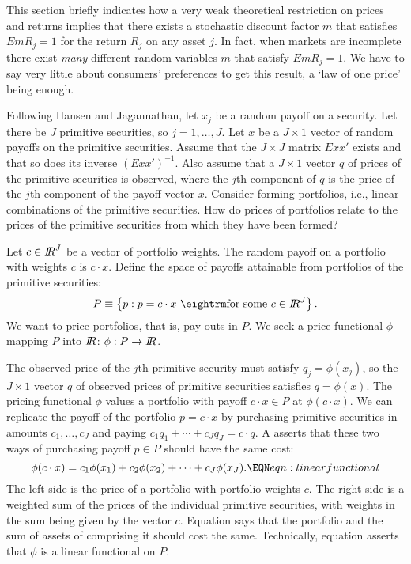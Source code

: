 This section briefly indicates how a very weak theoretical restriction on  prices and returns
implies that there exists a stochastic discount factor $m$ that satisfies
$E m R_j =1$ for the return $R_j$ on any asset $j$. In fact, when markets are incomplete there exist {\it many\/} different random variables
$m$ that satisfy $E m R_j =1$.  We have to say very little about consumers' preferences to get this result, a `law of one price' being
 enough.

Following Hansen and Jagannathan, let $x_j$ be a random payoff on a security.
Let there be $J$ primitive securities, so $j = 1, \ldots, J$.  Let
$x$ be a $J \times 1$  vector of random payoffs on the primitive securities.
Assume that the $J \times J$ matrix $E x x'$ exists and that so does its inverse
$(E x x')^{-1}$.  Also assume that
a $J \times 1$ vector $q$ of prices  of the primitive securities is observed,
where the $j$th component of $q$ is the price of the $j$th component of
the payoff vector $x$.  Consider forming portfolios, i.e., linear combinations of the primitive securities.
 How do  prices of portfolios
relate to the prices of the primitive securities from which they have been formed?

Let $c\in {I\kern-0.3em R}^J$ be a vector of portfolio weights.  The random payoff
on a portfolio with weights $c$ is $c \cdot x$.
Define the space of payoffs attainable from
portfolios of the primitive securities:
$$ P \equiv \left\{ p: p = c\cdot x \ {\rm for \ some} \ c \in \bbR^J\right\}.$$
We want to price  portfolios, that is, pay outs in $P$.
We seek a price functional $\phi$ mapping $P$ into ${I\kern-0.3em R}$:
$\phi: P \rightarrow {I\kern-0.3em R}$.


The observed price of the $j$th primitive security must satisfy  $q_j = \phi(x_j)$, so
the  $J \times 1$ vector $q$ of observed prices of primitive securities satisfies
 $q  = \phi(x)$.
The pricing functional $\phi$ values a portfolio with payoff $c \cdot x \in P$ at   $\phi(c\cdot x)$.  We can replicate the payoff of the portfolio $p = c \cdot x$ by purchasing primitive securities in amounts
$c_1, \ldots, c_J$ and paying
  $c_1 q_1 + \cdots + c_J q_J = c \cdot q$.  A  {\it {}\/} asserts that these two ways of purchasing payoff $p \in P$ should have the same cost:
$$  \phi(c \cdot x) = c_1 \phi(x_1) + c_2 \phi(x_2) + \cdots + c_J \phi(x_J) .\EQN eqn:linearfunctional $$
The left side is the price of a portfolio with portfolio weights $c$. The right side is a weighted sum of the prices of the
individual primitive securities, with weights in the sum being given by the vector $c$.  Equation  says that
the  portfolio and the  sum of assets of comprising it  should cost the same.  Technically,  equation   asserts that
  $\phi$ is a linear functional on $P$.

